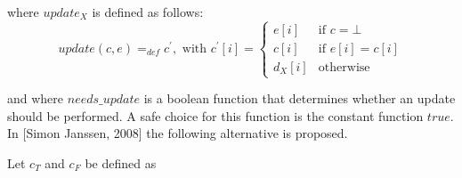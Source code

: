 \documentclass{article}
\begin{document}
where $update_{X}$ is defined as follows:%
\begin{equation*}
update(c,e)=_{def}c^{\prime },\text{ with }c^{\prime }[i]=\left\{
\begin{array}{ll}
e[i] & \text{if }c=\bot \\
c[i] & \text{if }e[i]=c[i] \\
d_{X}[i] & \text{otherwise}%
\end{array}%
\right.
\end{equation*}

and where $needs\_update$ is a boolean function that determines whether an
update should be performed. A safe choice for this function is the constant
function $true$. In [Simon Janssen, 2008] the following alternative is
proposed.

Let $c_{T}$ and $c_{F}$ be defined as
\end{document}
